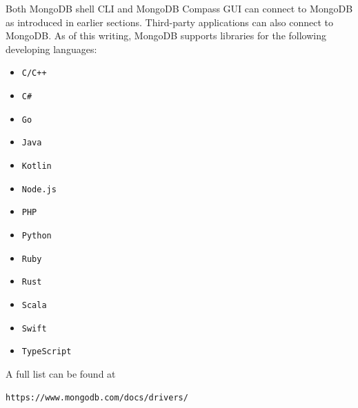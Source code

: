 Both MongoDB shell CLI and MongoDB Compass GUI can connect to MongoDB as introduced in earlier sections. Third-party applications can also connect to MongoDB. As of this writing, MongoDB supports libraries for the following developing languages:
\begin{multicols}{4}
\begin{itemize}
	\item \verb|C/C++|
	\item \verb|C#|
	\item \verb|Go|
	\item \verb|Java|
	\item \verb|Kotlin|
	\item \verb|Node.js|
	\item \verb|PHP|
	\item \verb|Python|
	\item \verb|Ruby|
	\item \verb|Rust|
	\item \verb|Scala|
	\item \verb|Swift|
	\item \verb|TypeScript|
\end{itemize}
\end{multicols}
A full list can be found at
\begin{lstlisting}
https://www.mongodb.com/docs/drivers/
\end{lstlisting}

